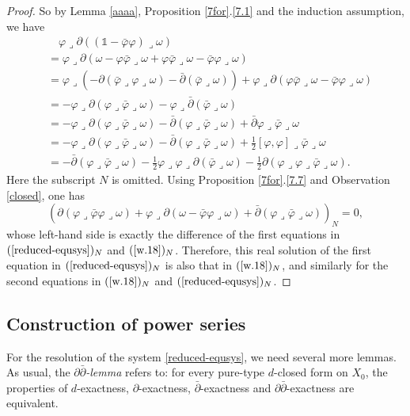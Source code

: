 \documentclass[12pt]{amsart}
\numberwithin{equation}{section}
\renewcommand{\1}{\mathds{1}}
\renewcommand{\>}{\rightarrow}
\newcommand{\p}{\partial}
\def\p{\partial}
\def\b{\bar}
\def\l{\lrcorner}
\begin{document}
\begin{proof}
So by Lemma \ref{aaaa}, Proposition \ref{7for}.\eqref{7.1} and the
induction assumption, we have
\begin{align*}
  &\quad\varphi\l\p((\1-\b{\varphi}\varphi)\l\omega)\\
&=\varphi\l\p(\omega-\varphi\b{\varphi}\l\omega+\varphi\b{\varphi}\l\omega-\b{\varphi}\varphi\l\omega)\\
&=\varphi\l(-\p(\b{\varphi}\l\varphi\l\omega)-\b{\p}(\b{\varphi}\l\omega))+\varphi\l\p(\varphi\b{\varphi}\l\omega-\b{\varphi}\varphi\l\omega)\\
&=-\varphi\l\p(\varphi\l\b{\varphi}\l\omega)-\varphi\l\b{\p}(\b{\varphi}\l\omega)\\
&=-\varphi\l\p(\varphi\l\b{\varphi}\l\omega)-\b{\p}(\varphi\l\b{\varphi}\l\omega)+\b{\p}\varphi\l\b{\varphi}\l\omega\\
&=-\varphi\l\p(\varphi\l\b{\varphi}\l\omega)-\b{\p}(\varphi\l\b{\varphi}\l\omega)+\frac{1}{2}[\varphi,\varphi]\l\b{\varphi}\l\omega\\
&=-\b{\p}(\varphi\l\b{\varphi}\l\omega)-\frac{1}{2}\varphi\l\varphi\l\p(\b{\varphi}\l\omega)-\frac{1}{2}\p(\varphi\l\varphi\l\b{\varphi}\l\omega).
\end{align*}
Here the subscript $N$ is omitted. Using Proposition
\ref{7for}.\eqref{7.7} and Observation \ref{closed}, one has
$$
\left(\p(\varphi\l\b{\varphi}\varphi\l\omega)+\varphi\l\p(\omega-\b{\varphi}\varphi\l\omega)+\b{\p}(\varphi\l\b{\varphi}\l\omega)\right)_N=0,
$$
whose left-hand side is exactly the difference of the first
equations in $(\ref{reduced-equsys})_N$ and $(\ref{w.18})_N$.
Therefore, this real solution of the first equation in
$(\ref{reduced-equsys})_N$ is also that in $(\ref{w.18})_N$, and
similarly for the second equations in $(\ref{w.18})_N$ and
$(\ref{reduced-equsys})_N$.
\end{proof}

\subsection{Construction of power series}

For the resolution of the system \eqref{reduced-equsys}, we need
several more lemmas. As usual, the \emph{$\p\b{\p}$-lemma} refers
to: for every pure-type $d$-closed form on $X_0$, the properties of
$d$-exactness, $\p$-exactness, $\b{\p}$-exactness and
$\p\b{\p}$-exactness are equivalent.
\end{document}
